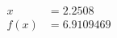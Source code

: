 \documentclass[preview]{standalone}
\begin{document}
\begin{align*}
x &= 2.2508\\f(x) &= 6.9109469
\end{align*}
\end{document}

